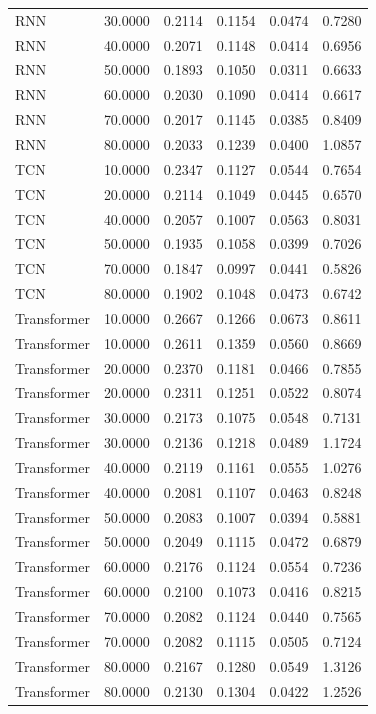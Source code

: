 \begin{tabular}{lrrrrr}
RNN & 30.0000 & 0.2114 & 0.1154 & 0.0474 & 0.7280 \\
RNN & 40.0000 & 0.2071 & 0.1148 & 0.0414 & 0.6956 \\
RNN & 50.0000 & 0.1893 & 0.1050 & 0.0311 & 0.6633 \\
RNN & 60.0000 & 0.2030 & 0.1090 & 0.0414 & 0.6617 \\
RNN & 70.0000 & 0.2017 & 0.1145 & 0.0385 & 0.8409 \\
RNN & 80.0000 & 0.2033 & 0.1239 & 0.0400 & 1.0857 \\
TCN & 10.0000 & 0.2347 & 0.1127 & 0.0544 & 0.7654 \\
TCN & 20.0000 & 0.2114 & 0.1049 & 0.0445 & 0.6570 \\
TCN & 40.0000 & 0.2057 & 0.1007 & 0.0563 & 0.8031 \\
TCN & 50.0000 & 0.1935 & 0.1058 & 0.0399 & 0.7026 \\
TCN & 70.0000 & 0.1847 & 0.0997 & 0.0441 & 0.5826 \\
TCN & 80.0000 & 0.1902 & 0.1048 & 0.0473 & 0.6742 \\
Transformer & 10.0000 & 0.2667 & 0.1266 & 0.0673 & 0.8611 \\
Transformer & 10.0000 & 0.2611 & 0.1359 & 0.0560 & 0.8669 \\
Transformer & 20.0000 & 0.2370 & 0.1181 & 0.0466 & 0.7855 \\
Transformer & 20.0000 & 0.2311 & 0.1251 & 0.0522 & 0.8074 \\
Transformer & 30.0000 & 0.2173 & 0.1075 & 0.0548 & 0.7131 \\
Transformer & 30.0000 & 0.2136 & 0.1218 & 0.0489 & 1.1724 \\
Transformer & 40.0000 & 0.2119 & 0.1161 & 0.0555 & 1.0276 \\
Transformer & 40.0000 & 0.2081 & 0.1107 & 0.0463 & 0.8248 \\
Transformer & 50.0000 & 0.2083 & 0.1007 & 0.0394 & 0.5881 \\
Transformer & 50.0000 & 0.2049 & 0.1115 & 0.0472 & 0.6879 \\
Transformer & 60.0000 & 0.2176 & 0.1124 & 0.0554 & 0.7236 \\
Transformer & 60.0000 & 0.2100 & 0.1073 & 0.0416 & 0.8215 \\
Transformer & 70.0000 & 0.2082 & 0.1124 & 0.0440 & 0.7565 \\
Transformer & 70.0000 & 0.2082 & 0.1115 & 0.0505 & 0.7124 \\
Transformer & 80.0000 & 0.2167 & 0.1280 & 0.0549 & 1.3126 \\
Transformer & 80.0000 & 0.2130 & 0.1304 & 0.0422 & 1.2526 \\
\bottomrule
\end{tabular}

